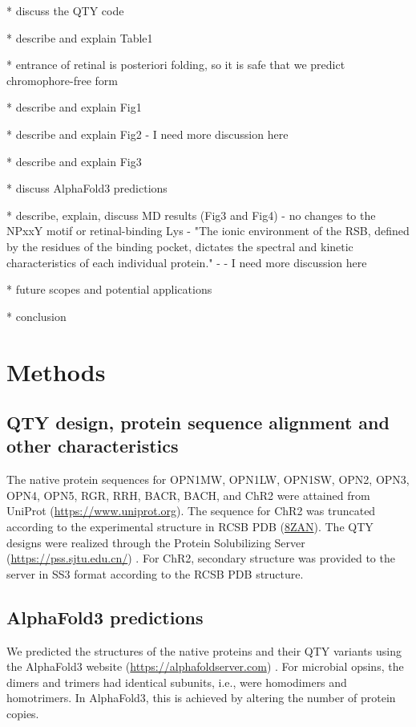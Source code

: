 \documentclass[fleqn,10pt,lineno]{manuscript}
\begin{document}
* discuss the QTY code

* describe and explain Table1

* entrance of retinal is posteriori folding, so it is safe that we predict chromophore-free form

* describe and explain Fig1

* describe and explain Fig2
	- I need more discussion here

* describe and explain Fig3

* discuss AlphaFold3 predictions

* describe, explain, discuss MD results (Fig3 and Fig4)
        - no changes to the NPxxY motif or retinal-binding Lys
        - "The ionic environment of the RSB, defined by the residues of the binding pocket, dictates the spectral and kinetic characteristics of each individual protein." - \citep{Fenno_2011}
	- I need more discussion here

* future scopes and potential applications

* conclusion

\section*{Methods}

\subsection*{QTY design, protein sequence alignment and other characteristics}

The native protein sequences for OPN1MW, OPN1LW, OPN1SW, OPN2, OPN3, OPN4, OPN5, RGR, RRH, BACR, BACH, and ChR2 were attained from UniProt (\url{https://www.uniprot.org}). The sequence for ChR2 was truncated according to the experimental structure in RCSB PDB (\href{https://www.rcsb.org/structure/8ZAN}{8ZAN}). The QTY designs were realized through the Protein Solubilizing Server (\url{https://pss.sjtu.edu.cn/}) \citep{Tao_2022}. For ChR2, secondary structure was provided to the server in SS3 format according to the RCSB PDB structure. 

\subsection*{AlphaFold3 predictions}

We predicted the structures of the native proteins and their QTY variants using the AlphaFold3 website (\url{https://alphafoldserver.com}) \citep{Abramson_2024}. For microbial opsins, the dimers and trimers had identical subunits, i.e., were homodimers and homotrimers. In AlphaFold3, this is achieved by altering the number of protein copies. 
\end{document}
